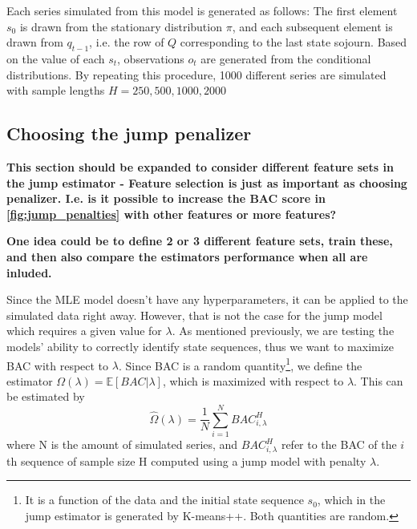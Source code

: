 Each series simulated from this model is generated as follows: The first element $s_0$ is drawn from the stationary distribution $\pi$, and each subsequent element is drawn from $q_{t-1}$, i.e. the row of $Q$ corresponding to the last state sojourn. Based on the value of each $s_t$, observations $o_t$ are generated from the conditional distributions. By repeating this procedure, 1000 different series are simulated with sample lengths $H = 250, 500, 1000, 2000$

\subsection{Choosing the jump penalizer}
\label{subsection: jump_penalizer}

\textbf{This section should be expanded to consider different feature sets in the jump estimator - Feature selection is just as important as choosing penalizer. I.e. is it possible to increase the BAC score in \cref{fig:jump_penalties} with other features or more features?}

\textbf{One idea could be to define 2 or 3 different feature sets, train these, and then also compare the estimators performance when all are inluded.}

Since the MLE model doesn't have any hyperparameters, it can be applied to the simulated data right away. However, that is not the case for the jump model which requires a given value for $\lambda$. As mentioned previously, we are testing the models' ability to correctly identify state sequences, thus we want to maximize BAC with respect to $\lambda$. Since BAC is a random quantity\footnote
{It is a function of the data and the initial state sequence $s_0$, which in the jump estimator is generated by K-means++. Both quantities are random.
},
we define the estimator $\Omega(\lambda)= \mathbb{E}[BAC|\lambda]$, which is maximized with respect to $\lambda$. This can be estimated by 
\begin{equation}
    \hat\Omega(\lambda) = \frac{1}{N} \sum_{i=1}^N BAC_{i, \lambda}^H
\end{equation}
where N is the amount of simulated series, and $BAC_{i, \lambda}^H$ refer to the BAC of the $i$th sequence of sample size H computed using a jump model with penalty $\lambda$.


